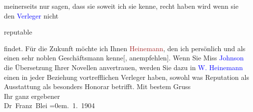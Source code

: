                     meinerseits nur sagen, dass sie soweit ich sie kenne, recht haben wird wenn sie
                    den \textcolor{blue}{Verleger}{} nicht
                        \begin{otherlanguage}{english}reputable\end{otherlanguage} findet. Für die Zukunft möchte
                    ich Ihnen \textcolor{brown}{Heinemann}{}\ledrightnote{\textcolor{brown}{William Heinemann Ltd}}, den ich persönlich und als
                    einen sehr noblen Geschäftsmann {\pb}kenne{[}, anempfehlen{]}. Wenn Sie Miss \textcolor{blue}{Johnson}{}\ledrightnote{\textcolor{blue}{Fanny Johnson}} die Übersetzung Ihrer Novellen anvertrauen,
                    werden Sie dazu in \textcolor{blue}{W. Heinemann}{}\ledrightnote{\textcolor{blue}{William Heinemann}} einen in
                    jeder Beziehung vortrefflichen Verleger haben, sowohl was Reputation als
                    Ausstattung als besonders Honorar betrifft.\pend
           \pstart
           Mit bestem Gruss{\\[\baselineskip]}Ihr ganz ergebener{\\[\baselineskip]}\spacefill\mbox{Dr Franz Blei}\pend
           \leftskip=0em{}. 1. 1904\pend
           \endnumbering{}  
      